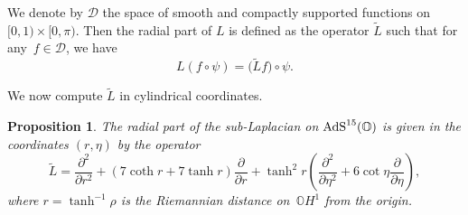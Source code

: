 \documentclass[pdftex]{sigma}
\numberwithin{equation}{section}
\newtheorem{Proposition}[Theorem]{Proposition}
 { \theoremstyle{definition}
\newtheorem{Example}[Theorem]{Example}
\newtheorem{Remark}[Theorem]{Remark} }
\begin{document}
We denote by $\mathcal{D}$ the space of smooth and compactly supported functions on $[0,1) \times [0,\pi)$. Then the radial part of $L$ is defined as the operator $\widetilde{L}$ such that for any~$f\in \mathcal{D}$, we have
\begin{equation}\label{intertwining}
L(f \circ \psi)=\big(\widetilde{L}f\big)\circ \psi.
\end{equation}

We now compute $\widetilde{L}$ in cylindrical coordinates.

\begin{Proposition}\label{prop:1}
The radial part of the sub-Laplacian on ${\rm AdS}^{15}(\mathbb{O})$ is given in the coordinates $(r,\eta)$ by the operator
\begin{equation*}%
\widetilde{L}=\frac{{\partial}^2}{\partial {r}^2}+(7\coth r+7\tanh r)\frac{{\partial}}{\partial {r}}+{\tanh^2 r}\left(\frac{{\partial}^2}{\partial {\eta}^2}+6\cot \eta\frac{{\partial}}{\partial {\eta}}\right),
\end{equation*}
where $r=\tanh^{-1}\rho$ is the Riemannian distance on~$\mathbb{O}H^1$ from the origin.
\end{Proposition}
\end{document}
